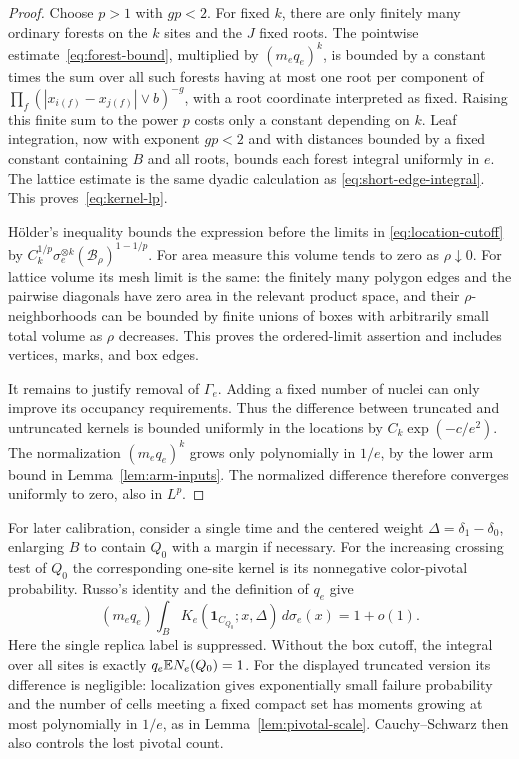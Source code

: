 \begin{proof}
Choose $p>1$ with $gp<2$.  For fixed $k$, there are only finitely many
ordinary forests on the $k$ sites and the $J$ fixed roots.  The
pointwise estimate~\eqref{eq:forest-bound}, multiplied by
$(m_eq_e)^k$, is bounded by a constant times the sum over all such
forests having at most one root per component of
$\prod_f(|x_{i(f)}-x_{j(f)}|\vee b)^{-g}$, with a root coordinate
interpreted as fixed.  Raising this finite sum to the power $p$ costs
only a constant depending on $k$.  Leaf integration, now with exponent
$gp<2$ and with distances bounded by a fixed constant containing $B$
and all roots, bounds each forest integral uniformly in $e$.
The lattice estimate is the same dyadic calculation as
\eqref{eq:short-edge-integral}.  This proves~\eqref{eq:kernel-lp}.

H\"older's inequality bounds the expression before the limits in
\eqref{eq:location-cutoff} by
$C_k^{1/p}\sigma_e^{\otimes k}(\mathcal B_\rho)^{1-1/p}$.
For area measure this volume tends to zero as $\rho\downarrow0$.
For lattice volume its mesh limit is the same: the finitely many
polygon edges and the pairwise diagonals have zero area in the relevant
product space, and their $\rho$-neighborhoods can be bounded by finite
unions of boxes with arbitrarily small total volume as $\rho$ decreases.
This proves the ordered-limit assertion and includes vertices, marks,
and box edges.

It remains to justify removal of $\Gamma_e$.  Adding a fixed number
of nuclei can only improve its occupancy requirements.  Thus the
difference between truncated and untruncated kernels is bounded
uniformly in the locations by
$C_k\exp(-c/e^2)$.  The normalization $(m_eq_e)^k$ grows only
polynomially in $1/e$, by the lower arm bound in
Lemma~\ref{lem:arm-inputs}.  The normalized difference therefore
converges uniformly to zero, also in $L^p$.
\end{proof}

For later calibration, consider a single time and the centered weight
$\Delta=\delta_1-\delta_0$, enlarging $B$ to contain $Q_0$ with a
margin if necessary.  For the increasing crossing test of $Q_0$
the corresponding one-site kernel is its nonnegative color-pivotal
probability.  Russo's identity and the definition of $q_e$ give
\begin{equation}
 (m_eq_e)\int_B
      K_e(\mathbf1_{C_{Q_0}};x,\Delta)\,d\sigma_e(x)=1+o(1).
 \label{eq:first-coefficient-one}
\end{equation}
Here the single replica label is suppressed.  Without the box cutoff,
the integral over all sites is exactly $q_e\mathbb E N_e(Q_0)=1$.
For the displayed truncated version its difference is negligible:
localization gives exponentially small failure probability and the
number of cells meeting a fixed compact set has moments growing at
most polynomially in $1/e$, as in Lemma~\ref{lem:pivotal-scale}.
Cauchy--Schwarz then also controls the lost pivotal count.

